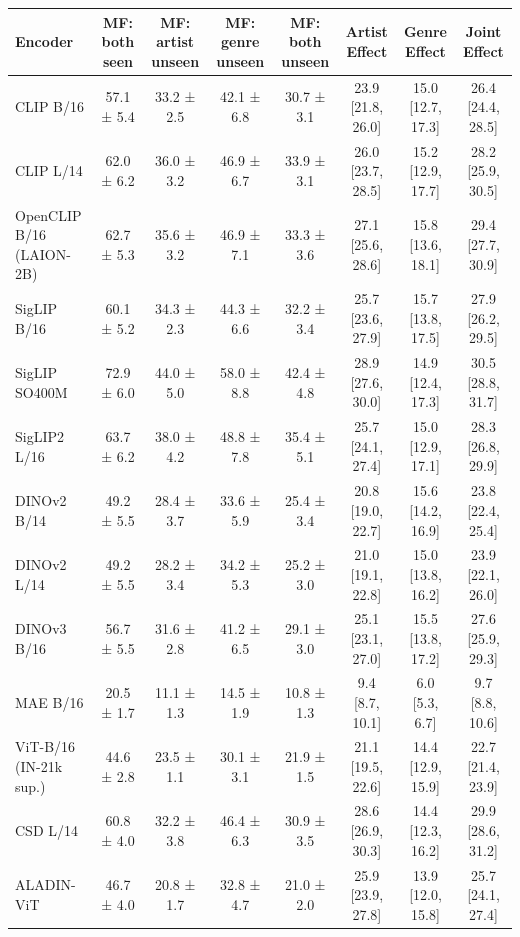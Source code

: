 \begin{tabular}{lccccccc}
\toprule
Encoder & MF: both seen & MF: artist unseen & MF: genre unseen & MF: both unseen & Artist Effect & Genre Effect & Joint Effect \\
\midrule
CLIP B/16 & 57.1 ± 5.4 & 33.2 ± 2.5 & 42.1 ± 6.8 & 30.7 ± 3.1 & 23.9 [21.8, 26.0] & 15.0 [12.7, 17.3] & 26.4 [24.4, 28.5] \\
CLIP L/14 & 62.0 ± 6.2 & 36.0 ± 3.2 & 46.9 ± 6.7 & 33.9 ± 3.1 & 26.0 [23.7, 28.5] & 15.2 [12.9, 17.7] & 28.2 [25.9, 30.5] \\
OpenCLIP B/16 (LAION-2B) & 62.7 ± 5.3 & 35.6 ± 3.2 & 46.9 ± 7.1 & 33.3 ± 3.6 & 27.1 [25.6, 28.6] & 15.8 [13.6, 18.1] & 29.4 [27.7, 30.9] \\
SigLIP B/16 & 60.1 ± 5.2 & 34.3 ± 2.3 & 44.3 ± 6.6 & 32.2 ± 3.4 & 25.7 [23.6, 27.9] & 15.7 [13.8, 17.5] & 27.9 [26.2, 29.5] \\
SigLIP SO400M & 72.9 ± 6.0 & 44.0 ± 5.0 & 58.0 ± 8.8 & 42.4 ± 4.8 & 28.9 [27.6, 30.0] & 14.9 [12.4, 17.3] & 30.5 [28.8, 31.7] \\
SigLIP2 L/16 & 63.7 ± 6.2 & 38.0 ± 4.2 & 48.8 ± 7.8 & 35.4 ± 5.1 & 25.7 [24.1, 27.4] & 15.0 [12.9, 17.1] & 28.3 [26.8, 29.9] \\
DINOv2 B/14 & 49.2 ± 5.5 & 28.4 ± 3.7 & 33.6 ± 5.9 & 25.4 ± 3.4 & 20.8 [19.0, 22.7] & 15.6 [14.2, 16.9] & 23.8 [22.4, 25.4] \\
DINOv2 L/14 & 49.2 ± 5.5 & 28.2 ± 3.4 & 34.2 ± 5.3 & 25.2 ± 3.0 & 21.0 [19.1, 22.8] & 15.0 [13.8, 16.2] & 23.9 [22.1, 26.0] \\
DINOv3 B/16 & 56.7 ± 5.5 & 31.6 ± 2.8 & 41.2 ± 6.5 & 29.1 ± 3.0 & 25.1 [23.1, 27.0] & 15.5 [13.8, 17.2] & 27.6 [25.9, 29.3] \\
MAE B/16 & 20.5 ± 1.7 & 11.1 ± 1.3 & 14.5 ± 1.9 & 10.8 ± 1.3 & 9.4 [8.7, 10.1] & 6.0 [5.3, 6.7] & 9.7 [8.8, 10.6] \\
ViT-B/16 (IN-21k sup.) & 44.6 ± 2.8 & 23.5 ± 1.1 & 30.1 ± 3.1 & 21.9 ± 1.5 & 21.1 [19.5, 22.6] & 14.4 [12.9, 15.9] & 22.7 [21.4, 23.9] \\
CSD L/14 & 60.8 ± 4.0 & 32.2 ± 3.8 & 46.4 ± 6.3 & 30.9 ± 3.5 & 28.6 [26.9, 30.3] & 14.4 [12.3, 16.2] & 29.9 [28.6, 31.2] \\
ALADIN-ViT & 46.7 ± 4.0 & 20.8 ± 1.7 & 32.8 ± 4.7 & 21.0 ± 2.0 & 25.9 [23.9, 27.8] & 13.9 [12.0, 15.8] & 25.7 [24.1, 27.4] \\
\bottomrule
\end{tabular}
